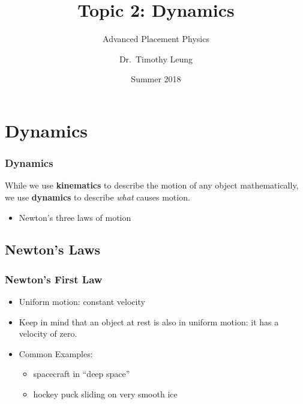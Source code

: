 \documentclass[12pt,compress,aspectratio=169]{beamer}
\title{Topic 2: Dynamics}
\subtitle{Advanced Placement Physics}
\author[TML]{Dr.\ Timothy Leung}
\institute{Olympiads School}
\date{Summer 2018}
\begin{document}
\section{Dynamics}

\begin{frame}
  \frametitle{Dynamics}
  While we use \textbf{kinematics} to describe the motion of any object
  mathematically, we use \textbf{dynamics} to describe \emph{what} causes
  motion.
  \begin{itemize}
  \item Newton's three laws of motion
  \end{itemize}
\end{frame}



\subsection{Newton's Laws}

\begin{frame}
  \frametitle{Newton's First Law}
  \begin{center}
  \end{center}

  \vspace{.3in}
  \begin{itemize}
  \item Uniform motion: constant velocity
  \item Keep in mind that an object at rest is also in uniform motion: it has
    a velocity of zero.
  \item Common Examples:
    \begin{itemize}
    \item spacecraft in ``deep space''
    \item hockey puck sliding on very smooth ice
    \end{itemize}
  \end{itemize}
\end{frame}
\end{document}
